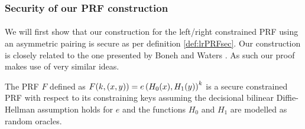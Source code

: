 		
		
		\subsubsection{Security of our PRF construction}
		
		\paragraph{} We will first show that our construction for the left/right constrained PRF using an asymmetric pairing is secure as per definition \autoref{def:lrPRFsec}. Our construction is closely related to the one presented by Boneh and Waters \cite{LRPRF}. As such our proof makes use of very similar ideas.
		
		\begin{theorem}
			The PRF $F$ defined as $F(k, (x,y)) = e\left(H_0(x), H_1(y) \right)^k$ is a secure constrained PRF with respect to its constraining keys assuming the decisional bilinear Diffie-Hellman assumption holds for $e$ and the functions $H_0$ and $H_1$ are modelled as random oracles.
		\end{theorem}
		
